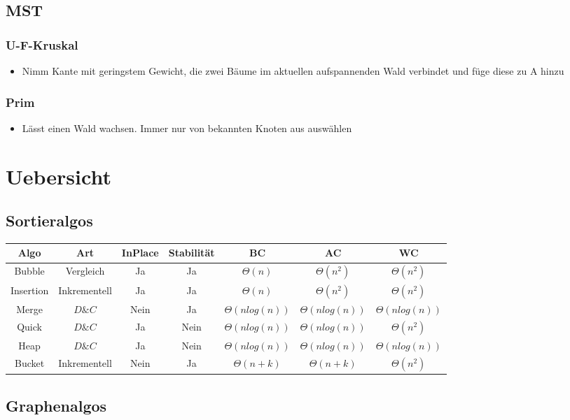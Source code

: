 \documentclass{article}
\begin{document}
\subsection{MST}
\subsubsection{U-F-Kruskal}
\begin{itemize}
\item Nimm Kante mit geringstem Gewicht, die zwei B{\"a}ume im aktuellen aufspannenden Wald verbindet und f{\"u}ge diese zu A hinzu
\end{itemize}

\subsubsection{Prim}
\begin{itemize}
\item L{\"a}sst einen Wald wachsen. Immer nur von bekannten Knoten aus ausw{\"a}hlen
\end{itemize}

\section{Uebersicht}
\subsection{Sortieralgos}
\begin{tabular}{c | c| c| c| c |c| c }
Algo & Art & InPlace & Stabilit{\"a}t & BC & AC & WC \\ \hline
Bubble& Vergleich& Ja & Ja & $\Theta(n)$ & $\Theta(n^2)$ & $\Theta(n^2)$\\
Insertion& Inkrementell & Ja & Ja & $\Theta(n)$ & $\Theta(n^2)$ & $\Theta(n^2)$ \\
Merge& $D\&C $ & Nein & Ja & $\Theta(nlog(n))$ & $\Theta(nlog(n))$ & $\Theta(nlog(n))$ \\
Quick& $D\&C $ & Ja & Nein & $\Theta(nlog(n))$ & $\Theta(nlog(n))$ & $\Theta(n^2)$ \\
Heap& $D\&C $ & Ja & Nein & $\Theta(nlog(n))$ & $\Theta(nlog(n))$ & $\Theta(nlog(n))$ \\
Bucket& Inkrementell & Nein & Ja & $\Theta(n+k)$ & $\Theta(n+k)$ & $\Theta(n^2)$ \\

\end{tabular}

\subsection{Graphenalgos}
\end{document}
